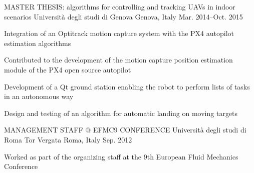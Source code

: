 \begin{cventries}
    \cventry
    {MASTER THESIS: algorithms for controlling and tracking UAVs in indoor scenarios} %
    {Università degli studi di Genova} %
    {Genova, Italy} %
    {Mar. 2014–Oct. 2015} %
    {
      \begin{cvitems} %
        \item {Integration of an Optitrack motion capture system with the PX4 autopilot estimation algorithms}
        \item {Contributed to the development of the motion capture position estimation module of the PX4 open source autopilot}
        \item {Development of a Qt ground station enabling the robot to perform lists of tasks in an autonomous way}
        \item {Design and testing of an algorithm for automatic landing on moving targets}
      \end{cvitems}
    }
  \cventry
    {MANAGEMENT STAFF @ EFMC9 CONFERENCE} %
    {Università degli studi di Roma Tor Vergata} %
    {Roma, Italy} %
    {Sep. 2012} %
    {
      \begin{cvitems} %
        \item {Worked as part of the organizing staff at the 9th European Fluid Mechanics Conference}
      \end{cvitems}
    }

\end{cventries}
